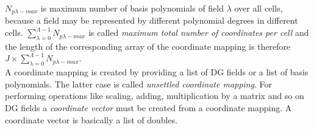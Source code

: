 \documentclass[BoSSSForSolvingConservationLaws.tex]{subfiles}
\begin{document}
$N_{p\lambda-max}$ is maximum number of basis polynomials of field $\lambda$ over all cells, because a field may be represented by different polynomial degrees in different cells. $\sum_{\lambda=0}^{\Lambda-1}N_{p\lambda-max}$ is called \emph{maximum total number of coordinates per cell} and the length of the corresponding array of the coordinate mapping is therefore $J\times\sum_{\lambda=0}^{\Lambda-1}N_{p\lambda-max}$.\\
A coordinate mapping is created by providing a list of DG fields or a list of basis polynomials. The latter case is called \emph{unsettled coordinate mapping}.
For performing operations like scaling, adding, multiplication by a matrix and so on DG fields a \emph{coordinate vector} must be created from a coordinate mapping. A coordinate vector is basically a list of doubles.
\end{document}
